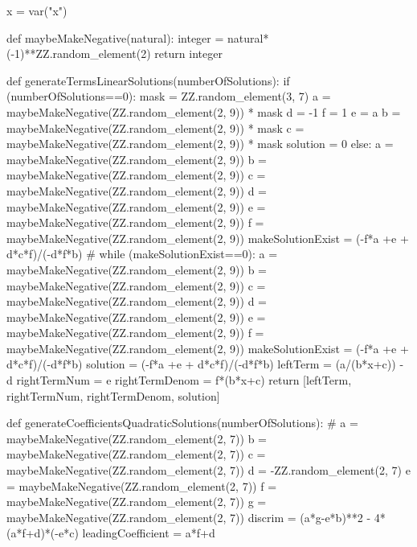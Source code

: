 \documentclass{ximera}
\begin{document}
\begin{sagesilent}
x = var("x")

def maybeMakeNegative(natural):
    integer = natural*(-1)**ZZ.random_element(2)
    return integer 

def generateTermsLinearSolutions(numberOfSolutions):
    if (numberOfSolutions==0):
        mask = ZZ.random_element(3, 7)
        a = maybeMakeNegative(ZZ.random_element(2, 9)) * mask
        d = -1
        f = 1
        e = a
        b = maybeMakeNegative(ZZ.random_element(2, 9)) * mask
        c = maybeMakeNegative(ZZ.random_element(2, 9)) * mask
        solution = 0
    else:
        a = maybeMakeNegative(ZZ.random_element(2, 9))
        b = maybeMakeNegative(ZZ.random_element(2, 9))
        c = maybeMakeNegative(ZZ.random_element(2, 9))
        d = maybeMakeNegative(ZZ.random_element(2, 9))
        e = maybeMakeNegative(ZZ.random_element(2, 9))
        f = maybeMakeNegative(ZZ.random_element(2, 9))
        makeSolutionExist = (-f*a +e + d*c*f)/(-d*f*b)
        #
        while (makeSolutionExist==0):
            a = maybeMakeNegative(ZZ.random_element(2, 9))
            b = maybeMakeNegative(ZZ.random_element(2, 9))
            c = maybeMakeNegative(ZZ.random_element(2, 9))
            d = maybeMakeNegative(ZZ.random_element(2, 9))
            e = maybeMakeNegative(ZZ.random_element(2, 9))
            f = maybeMakeNegative(ZZ.random_element(2, 9))
            makeSolutionExist = (-f*a +e + d*c*f)/(-d*f*b)
        solution = (-f*a +e + d*c*f)/(-d*f*b)
    leftTerm = (a/(b*x+c)) - d
    rightTermNum = e
    rightTermDenom = f*(b*x+c)
    return [leftTerm, rightTermNum, rightTermDenom, solution]

def generateCoefficientsQuadraticSolutions(numberOfSolutions):
    #
    a = maybeMakeNegative(ZZ.random_element(2, 7))
    b = maybeMakeNegative(ZZ.random_element(2, 7))
    c = maybeMakeNegative(ZZ.random_element(2, 7))
    d = -ZZ.random_element(2, 7)
    e = maybeMakeNegative(ZZ.random_element(2, 7))
    f = maybeMakeNegative(ZZ.random_element(2, 7))
    g = maybeMakeNegative(ZZ.random_element(2, 7))
    discrim = (a*g-e*b)**2 - 4*(a*f+d)*(-e*c)
    leadingCoefficient = a*f+d


\end{sagesilent}
\end{document}
